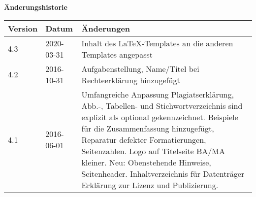 \textbf{Änderungshistorie}

\bigskip

{\renewcommand{\arraystretch}{1.5}
\begin{table}[h!]
\centering
\begin{tabular}{ |p{1.5cm}|p{2cm}|p{10cm}| } 
\hline
    \textbf{Version} & \textbf{Datum} & \textbf{Änderungen} \\
\hline
4.3 & 2020-03-31 & Inhalt des \LaTeX-Templates an die anderen Templates angepasst \\
\hline
4.2 & 2016-10-31 & Aufgabenstellung, Name/Titel bei Rechteerklärung hinzugefügt \\
\hline
4.1 & 2016-06-01 & Umfangreiche Anpassung Plagiatserklärung, Abb.-, Tabellen- und Stichwortverzeichnis sind explizit als optional gekennzeichnet. Beispiele für die Zusammenfassung hinzugefügt, Reparatur defekter Formatierungen, Seitenzahlen. Logo auf Titelseite BA/MA kleiner.
Neu: Obenstehende Hinweise, Seitenheader. Inhaltverzeichnis für Datenträger Erklärung zur Lizenz und Publizierung. \\
\hline
\end{tabular}
\end{table}}

\newpage
